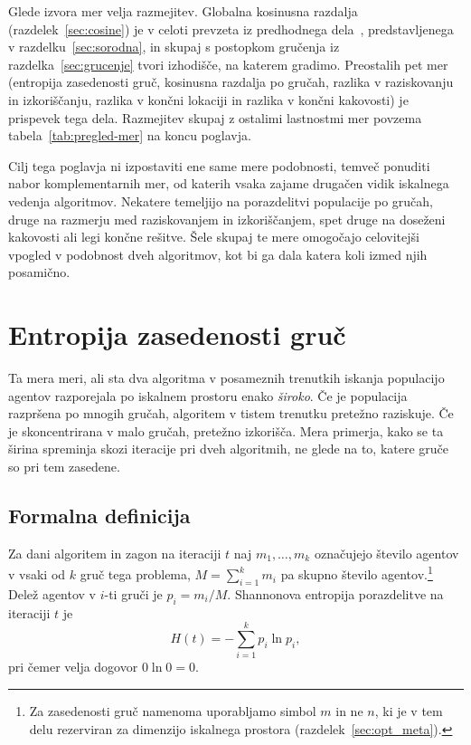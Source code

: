 \documentclass[a4paper, 12pt]{book}
\begin{document}
Glede izvora mer velja razmejitev. Globalna kosinusna razdalja
(razdelek~\ref{sec:cosine}) je v celoti prevzeta iz predhodnega
dela~\cite{clustopt2025}, predstavljenega v razdelku~\ref{sec:sorodna}, in
skupaj s postopkom gručenja iz razdelka~\ref{sec:grucenje} tvori izhodišče,
na katerem gradimo. Preostalih pet mer (entropija zasedenosti gruč,
kosinusna razdalja po gručah, razlika v raziskovanju in izkoriščanju, razlika
v končni lokaciji in razlika v končni kakovosti) je prispevek tega dela.
Razmejitev skupaj z ostalimi lastnostmi mer povzema
tabela~\ref{tab:pregled-mer} na koncu poglavja.

Cilj tega poglavja ni izpostaviti ene same  mere podobnosti,
temveč ponuditi nabor komplementarnih mer, od katerih vsaka zajame
drugačen vidik iskalnega vedenja algoritmov. Nekatere temeljijo na
porazdelitvi populacije po gručah, druge na razmerju med raziskovanjem in
izkoriščanjem, spet druge na doseženi kakovosti ali legi končne rešitve. Šele
skupaj te mere omogočajo celovitejši vpogled v podobnost dveh algoritmov, kot
bi ga dala katera koli izmed njih posamično.

\section{Entropija zasedenosti gruč}
\label{sec:entropy}

Ta mera meri, ali sta dva algoritma v posameznih trenutkih iskanja
populacijo agentov razporejala po iskalnem prostoru enako \emph{široko}. Če je
populacija razpršena po mnogih gručah, algoritem v tistem trenutku pretežno
raziskuje. Če je skoncentrirana v malo gručah, pretežno izkorišča.
Mera primerja, kako se ta širina spreminja skozi iteracije pri dveh
algoritmih, ne glede na to, katere gruče so pri tem zasedene.

\subsection{Formalna definicija}

Za dani algoritem in zagon na iteraciji $t$ naj $m_1, \dots, m_k$ označujejo
število agentov v vsaki od $k$ gruč tega problema, $M = \sum_{i=1}^k m_i$ pa
skupno število agentov.\footnote{Za zasedenosti gruč namenoma uporabljamo
simbol $m$ in ne $n$, ki je v tem delu rezerviran za dimenzijo iskalnega
prostora (razdelek~\ref{sec:opt_meta}).} Delež agentov v $i$-ti gruči je
$p_i = m_i / M$.
Shannonova entropija porazdelitve na iteraciji $t$ je
\[
    H(t) = -\sum_{i=1}^{k} p_i \ln p_i,
\]
pri čemer velja dogovor $0 \ln 0 = 0$.
\end{document}
